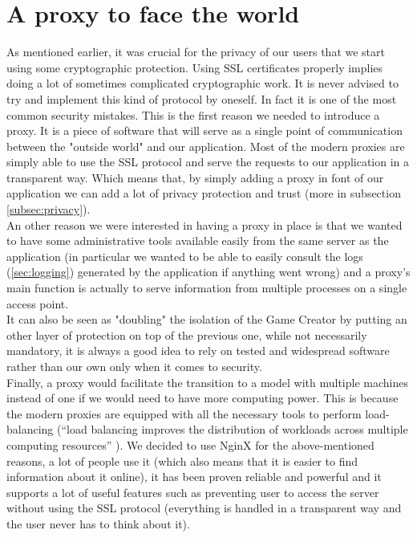 \section{A proxy to face the world}\label{sec:proxy}
As mentioned earlier, it was crucial for the privacy of our users that we start using some cryptographic protection. Using SSL certificates properly implies doing a lot of sometimes complicated cryptographic work. It is never advised to try and implement this kind of protocol by oneself. In fact it is one of the most common security mistakes\cite{selfcrypto}. This is the first reason we needed to introduce a proxy\cite{reverseproxy}. It is a piece of software that will serve as a single point of communication between the "outside world" and our application. Most of the modern proxies are simply able to use the SSL protocol and serve the requests to our application in a transparent way. Which means that, by simply adding a proxy in font of our application we can add a lot of privacy protection and trust (more in subsection \ref{subsec:privacy}).\\
An other reason we were interested in having a proxy in place is that we wanted to have some administrative tools available easily from the same server as the application (in particular we wanted to be able to easily consult the logs (\ref{sec:logging}) generated by the application if anything went wrong) and a proxy's main function is actually to serve information from multiple processes on a single access point.\\
It can also be seen as "doubling" the isolation of the Game Creator by putting an other layer of protection on top of the previous one, while not necessarily mandatory, it is always a good idea to rely on tested and widespread software rather than our own only when it comes to security.\\
Finally, a proxy would facilitate the transition to a model with multiple machines instead of one if we would need to have more computing power. This is because the modern proxies are equipped with all the necessary tools to perform load-balancing (``load balancing improves the distribution of workloads across multiple computing resources'' \cite{loadbalancing}).
We decided to use NginX\cite{nginx} for the above-mentioned reasons, a lot of people use it (which also means that it is easier to find information about it online), it has been proven reliable and powerful and it supports a lot of useful features such as preventing user to access the server without using the SSL protocol (everything is handled in a transparent way and the user never has to think about it).

